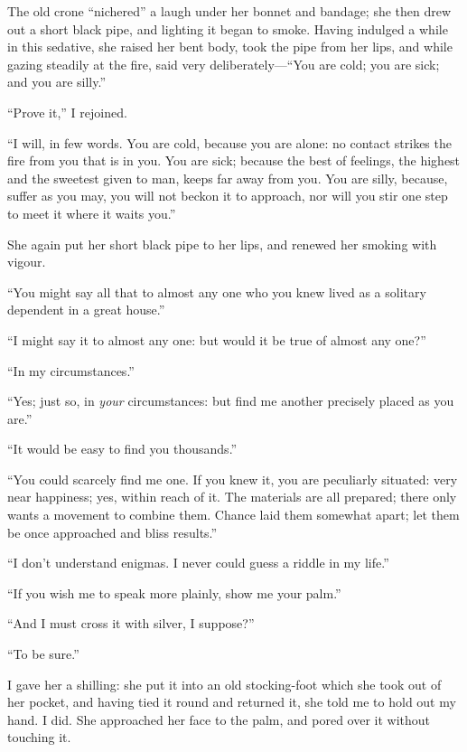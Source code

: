 The old crone \enquote{nichered} a laugh under her bonnet and bandage;
she then drew out a short black pipe, and lighting it began to smoke.
Having indulged a while in this sedative, she raised her bent body, took
the pipe from her lips, and while gazing steadily at the fire, said very
deliberately---\enquote{You are cold; you are sick; and you are silly.}

\enquote{Prove it,} I rejoined.

\enquote{I will, in few words. You are cold, because you are alone: no
	contact strikes the fire from you that is in you. You are sick; because
	the best of feelings, the highest and the sweetest given to man, keeps
	far away from you. You are silly, because, suffer as you may, you will
	not beckon it to approach, nor will you stir one step to meet it where
	it waits you.}

She again put her short black pipe to her lips, and renewed her smoking
with vigour.

\enquote{You might say all that to almost any one who you knew lived as
	a solitary dependent in a great house.}

\enquote{I might say it to almost any one: but would it be true of
	almost any one?}

\enquote{In my circumstances.}

\enquote{Yes; just so, in \emph{your} circumstances: but find me another
	precisely placed as you are.}

\enquote{It would be easy to find you thousands.}

\enquote{You could scarcely find me one. If you knew it, you are
	peculiarly situated: very near happiness; yes, within reach of it. The
	materials are all prepared; there only wants a movement to combine
	them. Chance laid them somewhat apart; let them be once approached and
	bliss results.}

\enquote{I don't understand enigmas. I never could guess a riddle in my
	life.}

\enquote{If you wish me to speak more plainly, show me your palm.}

\enquote{And I must cross it with silver, I suppose?}

\enquote{To be sure.}

I gave her a shilling: she put it into an old stocking-foot which she
took out of her pocket, and having tied it round and returned it, she
told me to hold out my hand. I did. She approached her face to the
palm, and pored over it without touching it.

